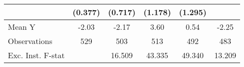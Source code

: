 {\begin{tabular}{l*{5}{c}}
            &     (0.377)         &     (0.717)         &     (1.178)         &     (1.295)         &                     \\
\midrule
Mean Y      &       -2.03         &       -2.17         &        3.60         &        0.54         &       -2.25         \\
Observations&         529         &         503         &         513         &         492         &         483         \\
Exc. Inst. F-stat&                     &      16.509         &      43.335         &      49.340         &      13.209         \\
\bottomrule
\end{tabular}
}
